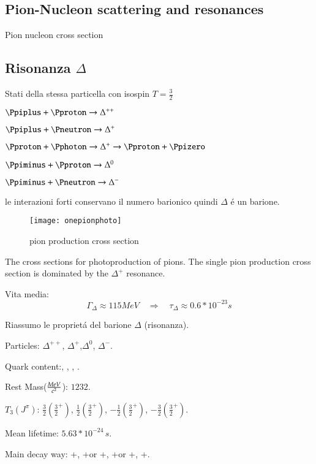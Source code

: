 \documentclass[main.tex]{subfiles}
\begin{document}
\subsection{Pion-Nucleon scattering and resonances}

Pion nucleon cross section

\subsection{Risonanza $\Delta$}

Stati della stessa particella con isospin $T=\frac{3}{2}$
\begin{itemize*}
\item $\Ppiplus+\Pproton\rightarrow\Delta^{++}$
\item $\Ppiplus+\Pneutron\rightarrow\Delta^+$
\item $\Pproton+\Pphoton\rightarrow\Delta^+\rightarrow\Pproton+\Ppizero$
\item $\Ppiminus+\Pproton\rightarrow\Delta^0$
\item $\Ppiminus+\Pneutron\rightarrow\Delta^-$
\end{itemize*}
le interazioni forti conservano il numero barionico quindi $\Delta$ \'e un barione.

\begin{figure}[!ht]
\centering
\texttt{[image: onepionphoto]}
\caption{pion production cross section}
\label{fig:onepionphoto}
\end{figure}

The cross sections for photoproduction of pions. The single pion production cross section is dominated by the $\Delta^+$ resonance.

Vita media:
\begin{equation*}
\Gamma_{\Delta}\approx115MeV\quad\Rightarrow\quad\tau_{\Delta}\approx0.6*10^{-23}s
\end{equation*}

Riassumo le propriet\'a del barione $\Delta$ (risonanza).

\begin{itemize*}
\item Particles: $\Delta^{++}$, $\Delta^+$,$\Delta^0$, $\Delta^-$.
\item Quark content:\Pup\Pup\Pup, \Pup\Pup\Pdown, \Pup\Pdown\Pdown, \Pdown\Pdown\Pdown.
\item Rest Mass($\frac{MeV}{c^2}$): $1232$.
\item $T_3(J^{\pi})$: $\frac{3}{2}(\frac{3}{2}^+)$, $\frac{1}{2}(\frac{3}{2}^+)$, $-\frac{1}{2}(\frac{3}{2}^+)$, $-\frac{3}{2}(\frac{3}{2}^+)$.
\item Mean lifetime: $5.63*10^{-24}\,s$.
\item Main decay way: \Pproton+\Ppiplus, \Pneutron+\Ppiplus or \Ppizero+\Pproton, \Pneutron+\Ppizero or \Ppiminus+\Pproton, \Pneutron+\Ppiminus.
\end{itemize*}
\end{document}
